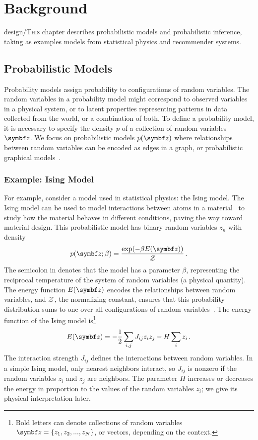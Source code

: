\chapter{Background}
\label{ch:background}
\lettrine[image=true,lines=3]{design/T}{his} chapter describes probabilistic models and probabilistic inference, taking as examples models from statistical physics and recommender systems.



\section{Probabilistic Models}
Probability models assign probability to configurations of random variables. The random variables in a probability model might correspond to observed variables in a physical system, or to latent properties representing patterns in data collected from the world, or a combination of both. To define a probability model, it is necessary to specify the density $p$ of a collection of random variables $\mbz$. We focus on probabilistic models $p(\mbz)$ where relationships between random variables can be encoded as edges in a graph, or  probabilistic graphical models~\citep{jordan2004graphical}.

\subsection{Example: Ising Model}
\label{sec:ising}
For example, consider a model used in statistical physics: the Ising model. The Ising model can be used to model interactions between atoms in a material~\citep{henelius2016refrustration} to study how the material behaves in different conditions, paving the way toward material design. This probabilistic model has binary random variables $z_n$ with density
\begin{equation}
  p(\mbz; \beta) = \frac{\exp(-\beta E(\mbz))}{\cZ}\, .
  \label{eq:boltzmann}
\end{equation}
The semicolon in  denotes that the model has a parameter $\beta$, representing the reciprocal temperature of the system of random variables (a physical quantity). The energy function $E(\mbz)$ encodes the relationships between random variables, and $\mathcal{Z}$, the normalizing constant, ensures that this probability distribution sums to one over all configurations of random variables~\citep{chandler1987introduction}. The energy function of the Ising model is\footnote{Bold letters can denote collections of random variables $\mbz = \{z_1, z_2,...,z_N\}$, or vectors, depending on the context.}
\begin{equation}
\label{eq:ising-energy}
  E(\mbz) = -\frac{1}{2}\sum_{i, j} J_{ij}z_i z_j - H\sum_i z_i\, .
\end{equation}
The interaction strength $J_{ij}$ defines the interactions between random variables. In a simple Ising model, only nearest neighbors interact, so $J_{ij}$ is nonzero if the random variables $z_i$ and $z_j$ are neighbors. The parameter $H$ increases or decreases the energy in proportion to the values of the random variables $z_i$; we give its physical interpretation later.

